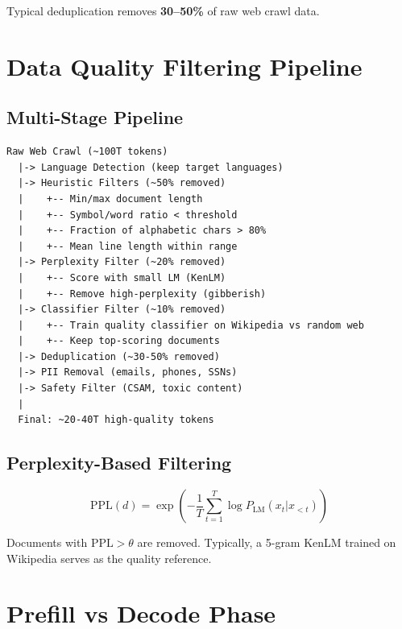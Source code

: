 \documentclass[11pt,a4paper]{article}
\begin{document}
Typical deduplication removes \textbf{30--50\%} of raw web crawl data.

\section{Data Quality Filtering Pipeline}

\subsection{Multi-Stage Pipeline}

\begin{tcolorbox}[colback=gray!5, colframe=gray!60!black, title={\bfseries Training Data Pipeline}]
\begin{lstlisting}[basicstyle=\ttfamily\small, frame=none, backgroundcolor=\color{gray!5}]
Raw Web Crawl (~100T tokens)
  |-> Language Detection (keep target languages)
  |-> Heuristic Filters (~50% removed)
  |    +-- Min/max document length
  |    +-- Symbol/word ratio < threshold
  |    +-- Fraction of alphabetic chars > 80%
  |    +-- Mean line length within range
  |-> Perplexity Filter (~20% removed)
  |    +-- Score with small LM (KenLM)
  |    +-- Remove high-perplexity (gibberish)
  |-> Classifier Filter (~10% removed)
  |    +-- Train quality classifier on Wikipedia vs random web
  |    +-- Keep top-scoring documents
  |-> Deduplication (~30-50% removed)
  |-> PII Removal (emails, phones, SSNs)
  |-> Safety Filter (CSAM, toxic content)
  |
  Final: ~20-40T high-quality tokens
\end{lstlisting}
\end{tcolorbox}

\subsection{Perplexity-Based Filtering}

$$\text{PPL}(d) = \exp\!\left(-\frac{1}{T}\sum_{t=1}^{T} \log P_{\text{LM}}(x_t | x_{<t})\right)$$

Documents with $\text{PPL} > \theta$ are removed. Typically, a 5-gram KenLM trained on Wikipedia serves as the quality reference.

\section{Prefill vs Decode Phase}
\end{document}
